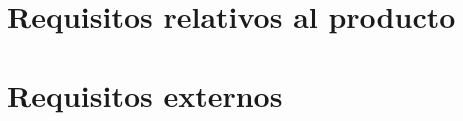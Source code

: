 	
	
	
	
	
	
	
	
	
	
	
\section{Requisitos relativos al producto}
    

\section{Requisitos externos}
    

